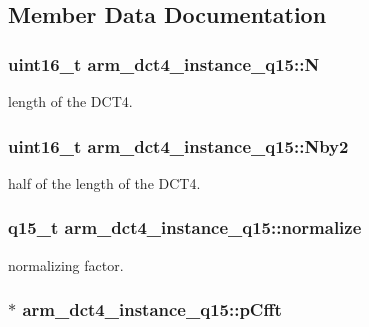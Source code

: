 \subsection{Member Data Documentation}
\hypertarget{structarm__dct4__instance__q15_a53d24009bb9b2e93d0aa07db7f1a6c25}{
\subsubsection[{N}]{\setlength{\rightskip}{0pt plus 5cm}uint16\-\_\-t arm\-\_\-dct4\-\_\-instance\-\_\-q15\-::\-N}}\label{structarm__dct4__instance__q15_a53d24009bb9b2e93d0aa07db7f1a6c25}
length of the D\-C\-T4. \hypertarget{structarm__dct4__instance__q15_af43dcbbc2fc661ffbc525afe3dcbd7da}{
\subsubsection[{Nby2}]{\setlength{\rightskip}{0pt plus 5cm}uint16\-\_\-t arm\-\_\-dct4\-\_\-instance\-\_\-q15\-::\-Nby2}}\label{structarm__dct4__instance__q15_af43dcbbc2fc661ffbc525afe3dcbd7da}
half of the length of the D\-C\-T4. \hypertarget{structarm__dct4__instance__q15_a197098140d68e89a08f7a249003a0b86}{
\subsubsection[{normalize}]{\setlength{\rightskip}{0pt plus 5cm}q15\-\_\-t arm\-\_\-dct4\-\_\-instance\-\_\-q15\-::normalize}}\label{structarm__dct4__instance__q15_a197098140d68e89a08f7a249003a0b86}
normalizing factor. \hypertarget{structarm__dct4__instance__q15_a7284932ee8c36107c33815eb62eadffc}{
\subsubsection[{p\-Cfft}]{$\ast$ arm\-\_\-dct4\-\_\-instance\-\_\-q15\-::p\-Cfft}}\label{structarm__dct4__instance__q15_a7284932ee8c36107c33815eb62eadffc}
